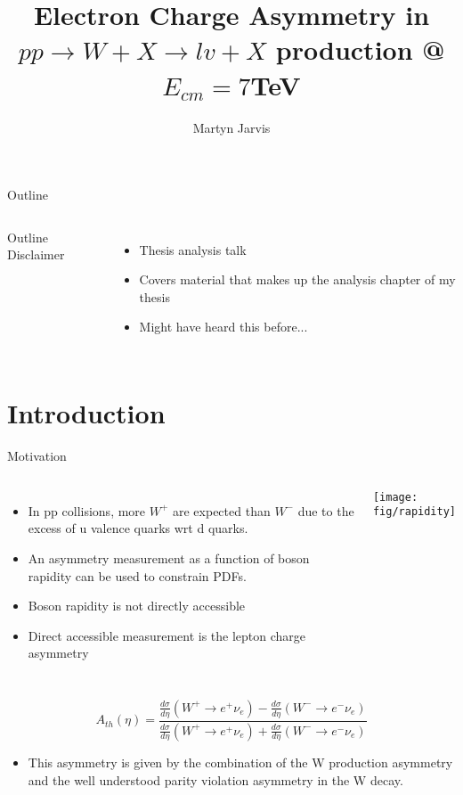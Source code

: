 \documentclass[8pt]{beamer}
\author{Martyn Jarvis}
\title[Electron Charge Asymmetry]{Electron Charge Asymmetry in $pp \to W+X \to
lv + X$ production @ $E_{cm} = 7$TeV}
\begin{document}
\begin{frame}
  \titlepage
\end{frame}

\begin{frame}{Outline}
\vspace{1cm}
  \begin{columns}[c]
  Outline
\vspace{1cm}
  \tableofcontents
  Disclaimer
\vspace{1cm}
  \begin{itemize}
    \item Thesis analysis talk
    \item Covers material that makes up the analysis chapter of my thesis
    \item Might have heard this before...
  \end{itemize}
  \end{columns}
\end{frame}

\section{Introduction}

\begin{frame}{Motivation}
  \begin{columns}[c]
  \begin{itemize}
    \item In pp collisions, more $W^+$ are expected than $W^-$ due to the excess of u valence quarks wrt d quarks.
    \item An asymmetry measurement as a function of boson rapidity can be used to constrain PDFs.
    \item Boson rapidity is not directly accessible
    \item Direct accessible measurement is the lepton charge asymmetry
  \end{itemize}
    \texttt{[image: fig/rapidity]}
  \end{columns}

    \begin{equation}
    A_{th}(\eta) = \frac{\frac{d\sigma}{d\eta}(W^{+}\to e^{+}\nu_{e}) - \frac{d\sigma}{d\eta}(W^{-}\to e^{-}\nu_{e})}
                        {\frac{d\sigma}{d\eta}(W^{+}\to e^{+}\nu_{e}) + \frac{d\sigma}{d\eta}(W^{-}\to e^{-}\nu_{e})}
    \end{equation}
  \begin{itemize}
    \item This asymmetry is given by the combination of the W production asymmetry and the well understood parity violation asymmetry in the W decay.
  \end{itemize}
\end{frame}
\end{document}

